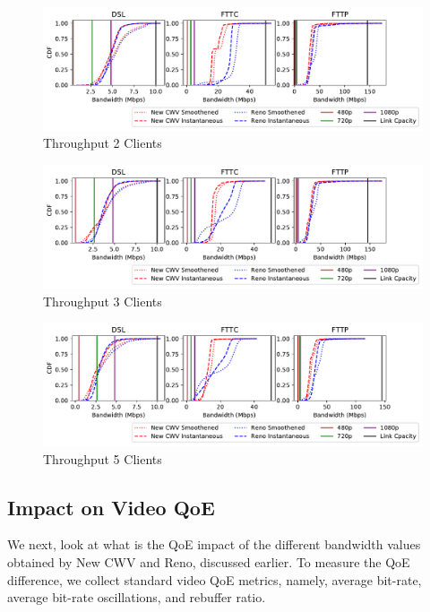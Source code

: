\documentclass[10pt,sigconf]{acmart}
\begin{document}
\begin{figure}
  \centering
  \includegraphics[width=\textwidth]{figures/Throughput_2_clients.pdf}
  \caption{Throughput 2 Clients}
  \label{fig:throughput-clients-2}
\end{figure}

\begin{figure}
  \centering
  \includegraphics[width=\textwidth]{figures/Throughput_3_clients.pdf}
  \caption{Throughput 3 Clients}
  \label{fig:throughput-clients-3}
\end{figure}

\begin{figure}
  \centering
  \includegraphics[width=\textwidth]{figures/Throughput_5_clients.pdf}
  \caption{Throughput 5 Clients}
  \label{fig:throughput-clients-5}
\end{figure}


\subsection{Impact on Video QoE}

We next, look at what is the QoE impact of the different bandwidth values obtained by New CWV and Reno, discussed earlier. To measure the QoE difference, we collect standard video QoE metrics, namely, average bit-rate, average bit-rate oscillations, and rebuffer ratio.
\end{document}
